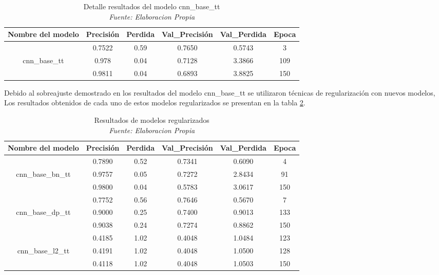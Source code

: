\begin{table}[!ht]
	\centering
	\begin{tabular}{|c|c|c|c|c|c|}
		\hline
		\textbf{Nombre del modelo} & \textbf{Precisión} & \textbf{Perdida} & \textbf{Val\_Precisión} & \textbf{Val\_Perdida} & \textbf{Epoca} \\ \hline
		~ & 0.7522 & 0.59 & 0.7650 & 0.5743 & 3 \\ \cline{2-6} 
		cnn\_base\_tt & 0.978 & 0.04 & 0.7128 & 3.3866 & 109 \\ \cline{2-6} 
		~ & 0.9811 & 0.04 & 0.6893 & 3.8825 & 150 \\ \hline
	\end{tabular}
	\caption{Detalle resultados del modelo cnn\_base\_tt
		\\\textit{Fuente: Elaboracion Propia}}
	\label{tbl:6}
\end{table}

Debido al sobreajuste demostrado en los resultados del modelo cnn\_base\_tt se utilizaron técnicas de regularización con nuevos modelos, Los resultados obtenidos de cada uno de estos modelos regularizados se presentan en la tabla \ref{tbl:7}.

\begin{table}[!ht]
	\centering
	\begin{tabular}{|c|c|c|c|c|c|}
		\hline
		\textbf{Nombre del modelo} & \textbf{Precisión} & \textbf{Perdida} & \textbf{Val\_Precisión} & \textbf{Val\_Perdida} & \textbf{Epoca} \\ \hline
		~ & 0.7890 & 0.52 & 0.7341 & 0.6090 & 4 \\ \cline{2-6} 
		cnn\_base\_bn\_tt & 0.9757 & 0.05 & 0.7272 & 2.8434 & 91 \\ \cline{2-6} 
		~ & 0.9800 & 0.04 & 0.5783 & 3.0617 & 150 \\ \hline
		~ & 0.7752 & 0.56 & 0.7646 & 0.5670 & 7 \\ \cline{2-6} 
		cnn\_base\_dp\_tt & 0.9000 & 0.25 & 0.7400 & 0.9013 & 133 \\ \cline{2-6} 
		~ & 0.9038 & 0.24 & 0.7274 & 0.8862 & 150 \\ \hline
		~ & 0.4185 & 1.02 & 0.4048 & 1.0484 & 123 \\ \cline{2-6} 
		cnn\_base\_l2\_tt & 0.4191 & 1.02 & 0.4048 & 1.0500 & 128 \\ \cline{2-6} 
		~ & 0.4118 & 1.02 & 0.4048 & 1.0503 & 150 \\ \hline
	\end{tabular}
	\caption{Resultados de modelos regularizados
		\\\textit{Fuente: Elaboracion Propia}}
	\label{tbl:7}
\end{table}

